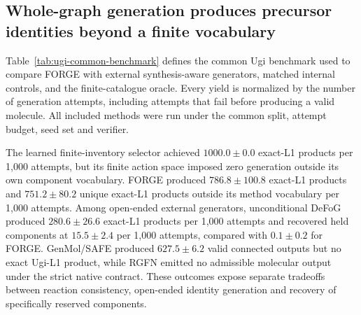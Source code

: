 \documentclass{article}
\begin{document}
\subsection{Whole-graph generation produces precursor identities beyond a finite vocabulary}

Table~\ref{tab:ugi-common-benchmark} defines the common Ugi benchmark used to compare FORGE with
external synthesis-aware generators, matched internal controls, and the finite-catalogue oracle.
Every yield is normalized by the number of generation attempts, including attempts that fail before
producing a valid molecule.
All included methods were run under the common split, attempt budget, seed set and verifier.

The learned finite-inventory selector achieved $1000.0\pm0.0$ exact-L1 products per 1,000 attempts,
but its finite action space imposed zero generation outside its own component vocabulary. FORGE
produced $786.8\pm100.8$ exact-L1 products and $751.2\pm80.2$ unique exact-L1 products outside its
method vocabulary per 1,000
attempts. Among open-ended external generators, unconditional DeFoG produced
$280.6\pm26.6$ exact-L1 products per 1,000 attempts and recovered held components at
$15.5\pm2.4$ per 1,000 attempts, compared with $0.1\pm0.2$ for FORGE. GenMol/SAFE produced
$627.5\pm6.2$ valid connected outputs but no exact Ugi-L1 product, while RGFN emitted no admissible
molecular output under the strict native contract. These outcomes expose separate tradeoffs between
reaction consistency, open-ended identity generation and recovery of specifically reserved
components.
\end{document}
